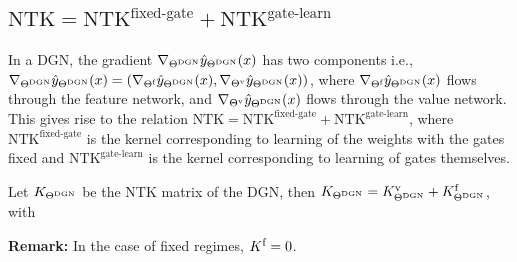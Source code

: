 \subsection{$\text{NTK}=\text{NTK}^{\text{fixed-gate}}+\text{NTK}^{\text{gate-learn}}$}
In a DGN, the gradient $\nabla_{\Theta^{\text{DGN}}}\hat{y}_{\Theta^{\text{DGN}}}(x)$ has two components i.e., $\nabla_{\Theta^{\text{DGN}}}\hat{y}_{\Theta^{\text{DGN}}}(x)=\left(\nabla_{\Theta^{\textrm{f}}}\hat{y}_{\Theta^{\text{DGN}}}(x),\nabla_{{\Theta}^{\text{v}}}\hat{y}_{\Theta^{\text{DGN}}}(x) \right)$, where $\nabla_{\Theta^{\textrm{f}}}\hat{y}_{\Theta^{\text{DGN}}}(x)$ flows through the feature network, and $\nabla_{{\Theta}^{\text{v}}}\hat{y}_{\Theta^{\text{DGN}}}(x)$ flows through the value network. This gives rise to the relation $\text{NTK}=\text{NTK}^{\text{fixed-gate}}+\text{NTK}^{\text{gate-learn}}$, where $\text{NTK}^{\text{fixed-gate}}$ is the kernel corresponding to learning of the weights with the gates fixed and $\text{NTK}^{\text{gate-learn}}$ is the kernel corresponding to learning of gates themselves. 
\begin{proposition}\label{prop:ntks} Let $K_{\Theta^{\text{DGN}}}$ be the NTK matrix of the DGN, then $K_{\Theta^{\text{DGN}}}=K^{\text{v}}_{\Theta^{\text{DGN}}}+K^{\text{f}}_{\Theta^{\text{DGN}}}$, with
\end{proposition}
\textbf{Remark:} In the case of fixed regimes, $K^{\text{f}}=0$. 
